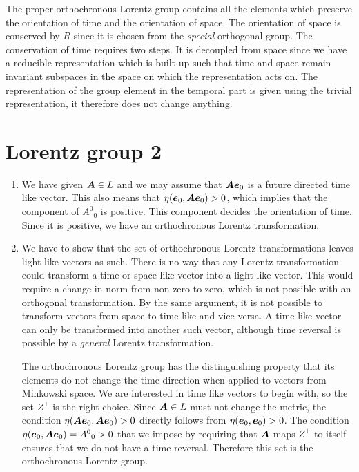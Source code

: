 \documentclass[11pt, english, fleqn, DIV=15, headinclude, BCOR=1cm]{scrartcl}
\begin{document}
The proper orthochronous Lorentz group contains all the elements which preserve
the orientation of time and the orientation of space. The orientation of space
is conserved by $R$ since it is chosen from the \emph{special} orthogonal
group. The conservation of time requires two steps. It is decoupled from space
since we have a reducible representation which is built up such that time and
space remain invariant subspaces in the space on which the representation acts
on. The representation of the group element in the temporal part is given using
the trivial representation, it therefore does not change anything.

\section{Lorentz group 2}
\label{homework:4}

\begin{enumerate}
    \item 
        We have given $\mat A \in L$ and we may assume that $\mat A \ev_0$ is a
        future directed time like vector. This also means that $\eta(\ev_0,
        \mat A \ev_0) > 0$, which implies that the component of $A^0{}_0$ is
        positive. This component decides the orientation of time. Since it is
        positive, we have an orthochronous Lorentz transformation.

    \item
        We have to show that the set of orthochronous Lorentz transformations
        leaves light like vectors as such. There is no way that any Lorentz
        transformation could transform a time or space like vector into a light
        like vector. This would require a change in norm from non-zero to zero,
        which is not possible with an orthogonal transformation. By the same
        argument, it is not possible to transform vectors from space to time
        like and vice versa. A time like vector can only be transformed into
        another such vector, although time reversal is possible by a
        \emph{general} Lorentz transformation.

        The orthochronous Lorentz group has the distinguishing property that
        its elements do not change the time direction when applied to vectors
        from Minkowski space. We are interested in time like vectors to begin
        with, so the set $Z^+$ is the right choice. Since $\mat A \in L$ must
        not change the metric, the condition $\eta(\mat A \ev_0, \mat A \ev_0)
        > 0$ directly follows from $\eta(\ev_0, \ev_0) > 0$. The condition
        $\eta(\ev_0, \mat A \ev_0) = A^0{}_0 > 0$ that we impose by requiring
        that $\mat A$ maps $Z^+$ to itself ensures that we do not have a time
        reversal. Therefore this set is the orthochronous Lorentz group.
\end{enumerate}
\end{document}
